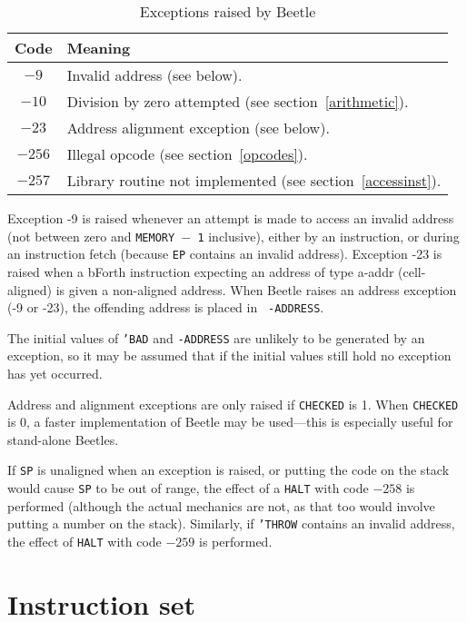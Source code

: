 \documentclass{article}
\newcommand{\spic}[1]{{\spfont \setlength{\baselineskip}{\normalbaselineskip} #1\/}}
\newlength{\opcode}\opcode=0.5in
\begin{document}
\begin{table}[htbp]
\begin{center}
\begin{tabular}{|c|l|} \hline
\rule[-2mm]{0mm}{6mm}\bf Code & \bf Meaning \\ \hline
$-9$ & Invalid address (see below). \\
$-10$ & Division by zero attempted (see section~\ref{arithmetic}). \\
$-23$ & Address alignment exception (see below). \\
$-256$ & Illegal opcode (see section~\ref{opcodes}). \\
$-257$ & Library routine not implemented (see section~\ref{accessinst}). \\ \hline
\end{tabular}
\end{center}
\vspace{-2mm}
\caption{\label{excepttable}Exceptions raised by Beetle}
\end{table}

Exception -9 is raised whenever an attempt is made to access an invalid address
(not between zero and {\tt MEMORY $-$ 1} inclusive), either by an instruction,
or during an instruction fetch (because {\tt EP} contains an invalid address).
Exception -23 is raised when a bForth instruction expecting an address of type
\spic{a-addr} (cell-aligned) is given a non-aligned address. When Beetle raises
an address exception (-9 or -23), the offending address is placed in {\tt
-ADDRESS}.

The initial values of {\tt 'BAD} and {\tt -ADDRESS} are unlikely to be generated
by an exception, so it may be assumed that if the initial values still hold no
exception has yet occurred.

Address and alignment exceptions are only raised if {\tt CHECKED} is 1. When
{\tt CHECKED} is 0, a faster implementation of Beetle may be used---this is
especially useful for stand-alone Beetles.

If {\tt SP} is unaligned when an exception is raised, or putting the code on the
stack would cause {\tt SP} to be out of range, the effect of a {\tt HALT} with
code $-258$ is performed (although the actual mechanics are not, as that too would
involve putting a number on the stack). Similarly, if {\tt 'THROW} contains an
invalid address, the effect of {\tt HALT} with code $-259$ is performed.


\section{Instruction set}
\label{instset}
\end{document}
